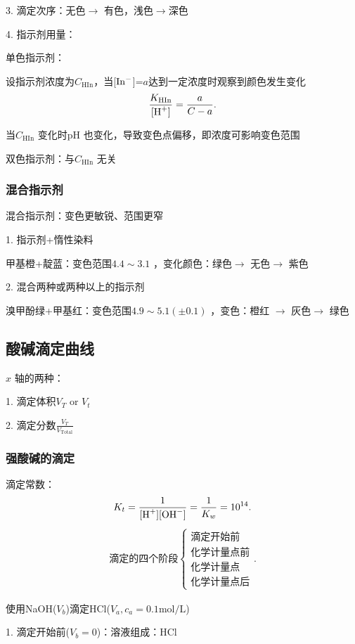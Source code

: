 3. 滴定次序：无色$\to $ 有色，浅色$ \to $深色

4. 指示剂用量：
\begin{eg}
    单色指示剂：

    设指示剂浓度为$C_{\text{HIn}}$，当[$\ce{In-}$]=$a$达到一定浓度时观察到颜色发生变化
    \[
        \frac{K_{\text{HIn}}}{[\ce{H+}]}=\frac{a}{C-a}
    .\] 

    当$C_{\text{HIn}}$ 变化时pH 也变化，导致变色点偏移，即浓度可影响变色范围
\end{eg}
双色指示剂：与$C_{\text{HIn}}$ 无关
\subsubsection{混合指示剂}%
\label{subsub:混合指示剂}
\begin{notation}
    混合指示剂：变色更敏锐、范围更窄
\end{notation}
1. 指示剂+惰性染料
\begin{eg}
    甲基橙+靛蓝：变色范围$4.4\sim 3.1$ ，变化颜色：绿色$\to $ 无色$\to $ 紫色
\end{eg}
2. 混合两种或两种以上的指示剂
\begin{eg}
    溴甲酚绿+甲基红：变色范围$4.9\sim 5.1\left( \pm 0.1 \right) $ ，变色：橙红 $\to $ 灰色$\to $ 绿色
\end{eg}
\subsection{酸碱滴定曲线}%
\label{sub:酸碱滴定曲线}
\begin{notation}
    $x$ 轴的两种：

    1. 滴定体积$V_T\text{ or }V_t$ 

    2. 滴定分数$\displaystyle{\frac{V_T}{V_{\text{Total}}}}$
\end{notation}
\subsubsection{强酸碱的滴定}%
\label{subsub:强酸碱的滴定}
滴定常数：\[
    K_t=\frac{1}{[\ce{H+}][\ce{OH-}]}=\frac{1}{K_w}=10^{14}
.\] 
\begin{align*}
    \text{滴定的四个阶段}
    \begin{cases}
        \text{滴定开始前}\\
        \text{化学计量点前}\\
        \text{化学计量点}\\
        \text{化学计量点后}
    \end{cases}
.\end{align*}
\begin{eg}
    使用NaOH($V_b$)滴定HCl($V_a,c_a=0.1\text{mol/L}$)
\end{eg}
1. 滴定开始前($V_b=0$)：溶液组成：HCl

